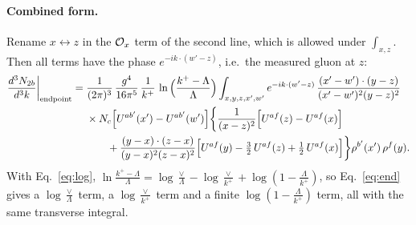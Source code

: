 \documentclass[10pt]{article}
\begin{document}
\paragraph{Combined form.} Rename $x\leftrightarrow z$ in the ${\cal O}_x$ term of the second line, which is allowed under $\int_{x,z}$. Then all terms have the phase $e^{-ik\cdot(w'-z)}$, i.e.\ the measured gluon at $z$:
\begin{align}
\frac{d^{3}N_{2b}}{d^{3}k}\bigg|_{\rm endpoint}={}&\frac{1}{(2\pi)^{3}}\,\frac{g^{4}}{16\pi^{5}}\,\frac{1}{k^{+}}\,\ln\Big(\frac{k^+-\Lambda}{\Lambda}\Big)\int_{x,y,z,x',w'}e^{-ik\cdot(w'-z)}\,\frac{(x'-w')\cdot(y-z)}{(x'-w')^{2}(y-z)^{2}}\notag\\
&\times N_c\Big[U^{ab'}(x')-U^{ab'}(w')\Big]\bigg\{\frac{1}{(x-z)^{2}}\Big[U^{af}(z)-U^{af}(x)\Big]\notag\\
&\qquad+\frac{(y-x)\cdot(z-x)}{(y-x)^{2}(z-x)^{2}}\Big[U^{af}(y)-\tfrac32\,U^{af}(z)+\tfrac12\,U^{af}(x)\Big]\bigg\}\rho^{b'}(x')\,\rho^{f}(y).
\label{eq:endc}
\end{align}
With Eq.~\eqref{eq:log}, $\ln\frac{k^+-\Lambda}{\Lambda}=\log\frac{\vee}{\Lambda}-\log\frac{\vee}{k^+}+\log(1-\frac{\Lambda}{k^+})$, so Eq.~\eqref{eq:end} gives a $\log\frac{\vee}{\Lambda}$ term, a $\log\frac{\vee}{k^+}$ term and a finite $\log(1-\frac{\Lambda}{k^+})$ term, all with the same transverse integral.
\end{document}
